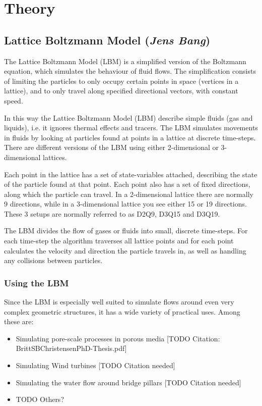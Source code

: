 \section{Theory}

\subsection{Lattice Boltzmann Model (\textit{Jens Bang})}
The Lattice Boltzmann Model (LBM) is a simplified version of the Boltzmann equation, which simulates the behaviour of fluid flows. The simplification consists of limiting the particles to only occupy certain points in space (vertices in a lattice), and to only travel along specified directional vectors, with constant speed. 

In this way the Lattice Boltzmann Model (LBM) describe simple fluids (gas and liquids), i.e. it ignores thermal effects and tracers. The LBM simulates movements in fluids by looking at particles found at points in a lattice at discrete time-steps. There are different versions of the LBM using either 2-dimensional or 3-dimensional lattices.

Each point in the lattice has a set of state-variables attached, describing the state of the particle found at that point. Each point also has a set of fixed directions, along which the particle can travel. In a 2-dimensional lattice there are normally 9 directions, while in a 3-dimensional lattice you see either 15 or 19 directions. These 3 setups are normally referred to as D2Q9, D3Q15 and D3Q19.


The LBM divides the flow of gases or fluids into small, discrete time-steps. For each time-step the algorithm traverses all lattice points and for each point calculates the velocity and direction the particle travels in, as well as handling any collisions between particles.

\subsubsection{Using the LBM}
Since the LBM is especially well suited to simulate flows around even very complex geometric structures, it has a wide variety of practical uses. Among these are:
\begin{itemize}
\item Simulating pore-scale processes in porous media [TODO Citation: BrittSBChristensenPhD-Thesis.pdf]
\item Simulating Wind turbines [TODO Citation needed]
\item Simulating the water flow around bridge pillars [TODO Citation needed]
\item TODO Others?
\end{itemize}

